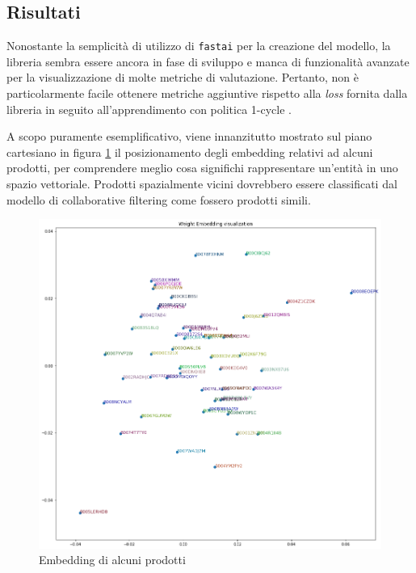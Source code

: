 \documentclass[hidelinks, 12pt]{article}
\begin{document}
\subsection{Risultati}

Nonostante la semplicità di utilizzo di \texttt{fastai} per la creazione del modello, la libreria sembra essere ancora in fase di sviluppo e manca di funzionalità avanzate per la visualizzazione di molte metriche di valutazione. Pertanto, non è particolarmente facile ottenere metriche aggiuntive rispetto alla \textit{loss} fornita dalla libreria in seguito all'apprendimento con politica 1-cycle \cite{site:1cycle}.

A scopo puramente esemplificativo, viene innanzitutto mostrato sul piano cartesiano in figura \ref{fig:embedding-chart} il posizionamento degli embedding relativi ad alcuni prodotti, per comprendere meglio cosa significhi rappresentare un'entità in uno spazio vettoriale. Prodotti spazialmente vicini dovrebbero essere classificati dal modello di collaborative filtering come fossero prodotti simili.

\begin{figure}[H]
	\centering
	\includegraphics[scale=0.30]{images/07_04_embeddings.png}
	\caption[Embedding di alcuni prodotti]{Embedding di alcuni prodotti}
	\label{fig:embedding-chart}
\end{figure}
\end{document}
